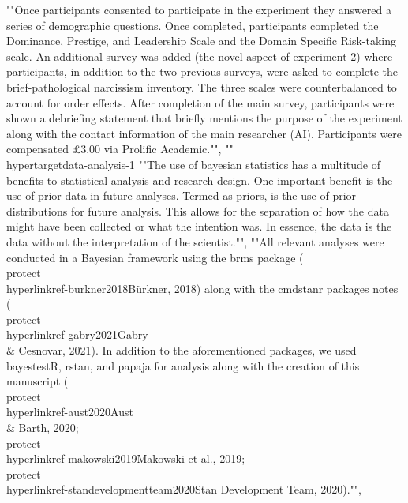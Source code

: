 {{{{{{{{{{{{{{{{{{{{""Once participants consented to participate in the experiment they answered a series of demographic questions. Once completed, participants completed the Dominance, Prestige, and Leadership Scale and the Domain Specific Risk-taking scale. An additional survey was added (the novel aspect of experiment 2) where participants, in addition to the two previous surveys, were asked to complete the brief-pathological narcissism inventory. The three scales were counterbalanced to account for order effects. After completion of the main survey, participants were shown a debriefing statement that briefly mentions the purpose of the experiment along with the contact information of the main researcher (AI). Participants were compensated £3.00 via Prolific Academic."", 
""\\hypertarget{data-analysis-1}{%
""The use of bayesian statistics has a multitude of benefits to statistical analysis and research design. One important benefit is the use of prior data in future analyses. Termed as priors, is the use of prior distributions for future analysis. This allows for the separation of how the data might have been collected or what the intention was. In essence, the data is the data without the interpretation of the scientist."", ""All relevant analyses were conducted in a Bayesian framework using the brms package (\\protect\\hyperlink{ref-burkner2018}{Bürkner, 2018}) along with the cmdstanr packages notes (\\protect\\hyperlink{ref-gabry2021}{Gabry \\& Cesnovar, 2021}). In addition to the aforementioned packages, we used bayestestR, rstan, and papaja for analysis along with the creation of this manuscript (\\protect\\hyperlink{ref-aust2020}{Aust \\& Barth, 2020}; \\protect\\hyperlink{ref-makowski2019}{Makowski et al., 2019}; \\protect\\hyperlink{ref-standevelopmentteam2020}{Stan Development Team, 2020})."", 
}}}}}}}}}}}}}}}}}}}}}
